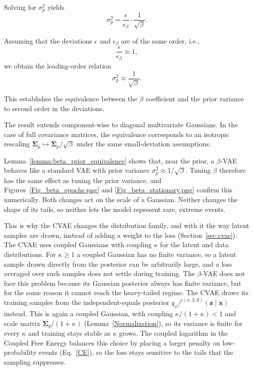 \documentclass[twoside,11pt]{article}
\renewenvironment{proof}{\par\noindent{\bf Proof\ }}{\hfill\BlackBox\par\vspace{2mm}}
\begin{document}
\begin{proof}
Solving for $\sigma_p^2$ yields
\begin{equation}
\sigma_p^2
=
\frac{\epsilon}{\epsilon_\beta}\cdot \frac{1}{\sqrt{\beta}}.
\end{equation}

Assuming that the deviations $\epsilon$ and $\epsilon_\beta$ are of the same order, i.e.,
\[
\frac{\epsilon}{\epsilon_\beta} \approx 1,
\]
we obtain the leading-order relation
\[
\sigma_p^2 \approx \frac{1}{\sqrt{\beta}}.
\]

This establishes the equivalence between the $\beta$ coefficient and the prior variance to second order in the deviations.
\end{proof}

The result extends component-wise to diagonal multivariate Gaussians. In the case of full covariance matrices, the equivalence corresponds to an isotropic rescaling $\boldsymbol{\Sigma}_p \mapsto \boldsymbol{\Sigma}_p / \sqrt{\beta}$ under the same small-deviation assumptions.

Lemma~\ref{lemma:beta_prior_equivalence} shows that, near the prior, a $\beta$-VAE behaves like a standard VAE with prior variance $\sigma_p^2 \approx 1/\sqrt{\beta}$. Tuning $\beta$ therefore has the same effect as tuning the prior variance, and Figures~\ref{Fig_beta_epochs.png} and \ref{Fig_beta_stationary.png} confirm this numerically. Both changes act on the scale of a Gaussian. Neither changes the shape of its tails, so neither lets the model represent rare, extreme events.

This is why the CVAE changes the distribution family, and with it the way latent samples are drawn, instead of adding a weight to the loss (Section~\ref{sec:cvae}). The CVAE uses coupled Gaussians with coupling $\kappa$ for the latent and data distributions. For $\kappa \geq 1$ a coupled Gaussian has no finite variance, so a latent sample drawn directly from the posterior can be arbitrarily large, and a loss averaged over such samples does not settle during training. The $\beta$-VAE does not face this problem because its Gaussian posterior always has finite variance, but for the same reason it cannot reach the heavy-tailed regime. The CVAE draws its training samples from the independent-equals posterior $q_\phi/^{\iota(\kappa,2,d)}(\mathbf{z}\mid\mathbf{x})$ instead. This is again a coupled Gaussian, with coupling $\kappa/(1+\kappa) < 1$ and scale matrix $\boldsymbol{\Sigma}_q/(1+\kappa)$ (Lemma~\ref{Normalization}), so its variance is finite for every $\kappa$ and training stays stable as $\kappa$ grows. The coupled logarithm in the Coupled Free Energy balances this choice by placing a larger penalty on low-probability events (Eq.~\ref{CE}), so the loss stays sensitive to the tails that the sampling suppresses.
\end{document}
